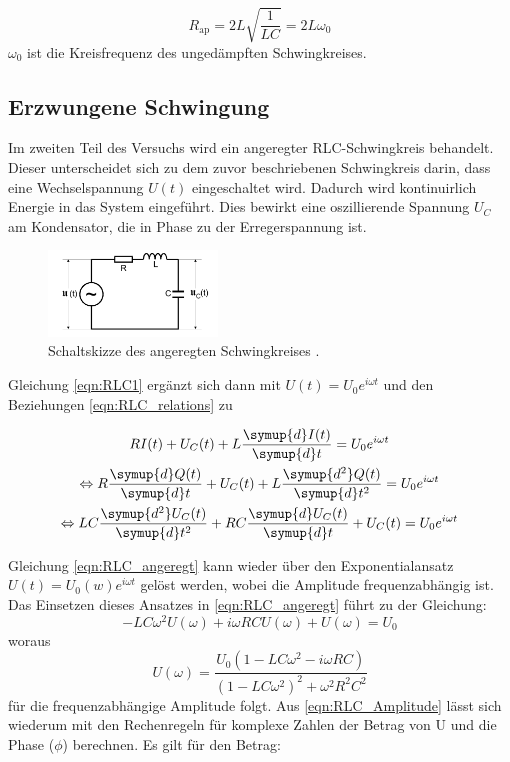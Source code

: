 \begin{equation}
    \label{eqn:R_ap}
    R_\text{ap} =2L \sqrt{\frac{1}{LC}} = 2L \omega_0
\end{equation}
$\omega_0$ ist die Kreisfrequenz des ungedämpften Schwingkreises.



\subsection{Erzwungene Schwingung}
\label{sec:Theorie_2}

Im zweiten Teil des Versuchs wird ein angeregter RLC-Schwingkreis behandelt. Dieser unterscheidet sich zu dem zuvor
beschriebenen Schwingkreis darin, dass eine Wechselspannung $U(t)$ eingeschaltet wird. Dadurch wird kontinuirlich Energie in das 
System eingeführt. Dies bewirkt eine oszillierende Spannung $U_C$ am Kondensator, die in Phase zu der Erregerspannung ist.

\begin{figure}
	\centering
    \includegraphics[width=0.4\textwidth]{content/RLC_angeregt.pdf}
	\caption{Schaltskizze des angeregten Schwingkreises \cite{v354}.}
	\label{fig:RLC_angeregt}
\end{figure}

Gleichung \eqref{eqn:RLC1} ergänzt sich dann mit $U(t) = U_0e^{i\omega t}$ und den Beziehungen \eqref{eqn:RLC_relations} zu

\begin{gather}  
    R I(t) + U_C(t) + L \frac{\symup{d}I(t)}{\symup{d}t} = U_0e^{i\omega t} \nonumber \\
    \Leftrightarrow R \frac{\symup{d}Q(t)}{\symup{d}t} + U_C(t)    + L \frac{\symup{d^2}Q(t)}{\symup{d}t^2} = U_0e^{i\omega t} \nonumber \\
    \Leftrightarrow LC \frac{\symup{d^2}U_C(t)}{\symup{d}t^2} + RC \frac{\symup{d}U_C(t)}{\symup{d}t} + U_C(t) = U_0e^{i\omega t}
    \label{eqn:RLC_angeregt}
\end{gather}

Gleichung \eqref{eqn:RLC_angeregt} kann wieder über den Exponentialansatz $U(t) = U_0(w)e^{i\omega t}$ gelöst werden,
wobei die Amplitude frequenzabhängig ist. Das Einsetzen dieses Ansatzes in \eqref{eqn:RLC_angeregt} führt zu der Gleichung:
\begin{equation*}
    -LC\omega^2 U(\omega) + i\omega RC U(\omega) + U(\omega) = U_0
\end{equation*}
woraus 
\begin{equation}
    \label{eqn:RLC_Amplitude}
    U(\omega) = \frac{U_0 (1-LC\omega^2-i\omega RC)}{(1-LC\omega^2)^2+\omega^2 R^2 C^2}
\end{equation}
für die frequenzabhängige Amplitude folgt. Aus \eqref{eqn:RLC_Amplitude} lässt sich wiederum mit den Rechenregeln für
komplexe Zahlen der Betrag von U und die Phase ($\phi$) berechnen. Es gilt für den Betrag:

